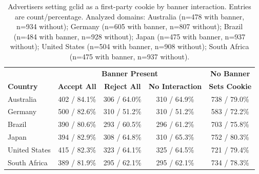 \begin{table}[t!]
    \centering
    \small
    \begin{tabular}{l|ccc|c}
    \toprule
        & \multicolumn{3}{c|}{\textbf{Banner Present}} & \textbf{No Banner} \\
        \textbf{Country} & \textbf{Accept All} & \textbf{Reject All} & \textbf{No Interaction} & \textbf{Sets Cookie} \\
        \midrule
        Australia & 402 / 84.1\% & 306 / 64.0\% & 310 / 64.9\% & 738 / 79.0\% \\
        Germany & 500 / 82.6\% & 310 / 51.2\% & 310 / 51.2\% & 583 / 72.2\% \\
        Brazil & 390 / 80.6\% & 293 / 60.5\% & 296 / 61.2\% & 703 / 75.8\% \\
        Japan & 394 / 82.9\% & 308 / 64.8\% & 310 / 65.3\% & 752 / 80.3\% \\
        United States & 415 / 82.3\% & 323 / 64.1\% & 325 / 64.5\% & 721 / 79.4\% \\
        South Africa & 389 / 81.9\% & 295 / 62.1\% & 295 / 62.1\% & 734 / 78.3\% \\
        \bottomrule
    \end{tabular}
\caption{Advertisers setting gclid as a first-party cookie by banner interaction.
Entries are count/percentage. Analyzed domains: Australia (n=478 with banner, n=934 without); Germany (n=605 with banner, n=807 without); Brazil (n=484 with banner, n=928 without); Japan (n=475 with banner, n=937 without); United States (n=504 with banner, n=908 without); South Africa (n=475 with banner, n=937 without).}
    \label{tab:gclid_breakdown}
\end{table}